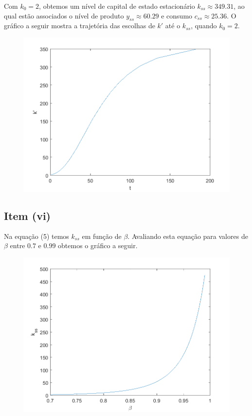 \documentclass{article}
\begin{document}
Com $k_0 = 2$, obtemos um nível de capital de estado estacionário $k_{ss} \approx 349.31$, 
ao qual estão associados o nível de produto $y_{ss} \approx 60.29$ e consumo $c_{ss} \approx 25.36$.
O gráfico a seguir mostra a trajetória das escolhas de $k'$ até o $k_{ss}$, quando $k_0 = 2$.

\begin{figure}[!h]
  \includegraphics[scale=0.6]{ex2/ex2_2.png}
\end{figure}

\newpage
\subsection*{Item (vi)}

Na equação (5) temos $k_{ss}$ em função de $\beta$. Avaliando esta equação para valores
de $\beta$ entre $0.7$ e $0.99$ obtemos o gráfico a seguir.

\begin{figure}[!h]
  \includegraphics[scale=0.6]{ex2/ex2_3.png}
\end{figure}
\end{document}
